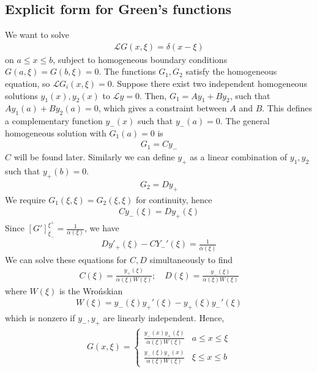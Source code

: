 \subsection{Explicit form for Green's functions}
We want to solve
\begin{align*}
	\mathcal L G(x,\xi) = \delta(x-\xi)
\end{align*}
on $a \leq x \leq b$, subject to homogeneous boundary conditions $G(a,\xi) = G(b,\xi) = 0$.
The functions $G_1, G_2$ satisfy the homogeneous equation, so $\mathcal L G_i(x,\xi) = 0$.
Suppose there exist two independent homogeneous solutions $y_1(x), y_2(x)$ to $\mathcal L y = 0$.
Then, $G_1 = A y_1 + B y_2$, such that $A y_1(a) + B y_2(a) = 0$, which gives a constraint between $A$ and $B$.
This defines a complementary function $y_-(x)$ such that $y_-(a) = 0$.
The general homogeneous solution with $G_1(a) = 0$ is
\begin{align*}
	G_1 = C y_-
\end{align*}
$C$ will be found later.
Similarly we can define $y_+$ as a linear combination of $y_1, y_2$ such that $y_+(b) = 0$.
\begin{align*}
	G_2 = D y_+
\end{align*}
We require $G_1(\xi, \xi) = G_2(\xi, \xi)$ for continuity, hence
\begin{align*}
	C y_-(\xi) = D y_+(\xi)
\end{align*}
Since $[G']_{\xi_-}^{\xi^+} = \frac{1}{\alpha(\xi)}$, we have
\begin{align*}
	Dy'_+(\xi) - C Y_-'(\xi) = \frac{1}{\alpha(\xi)}
\end{align*}
We can solve these equations for $C, D$ simultaneously to find
\begin{align*}
	C(\xi) = \frac{y_+(\xi)}{\alpha(\xi)W(\xi)};\quad D(\xi) = \frac{y_-(\xi)}{\alpha(\xi)W(\xi)}
\end{align*}
where $W(\xi)$ is the Wro\'nskian
\begin{align*}
	W(\xi) = y_-(\xi) y_+'(\xi) - y_+(\xi) y_-'(\xi)
\end{align*}
which is nonzero if $y_-, y_+$ are linearly independent.
Hence,
\begin{align*}
	G(x,\xi) = \begin{cases}
		\frac{y_-(x) y_+(\xi)}{\alpha(\xi)W(\xi)} & a \leq x \leq \xi \\
		\frac{y_-(\xi) y_+(x)}{\alpha(\xi)W(\xi)} & \xi \leq x \leq b
	\end{cases}
\end{align*}

